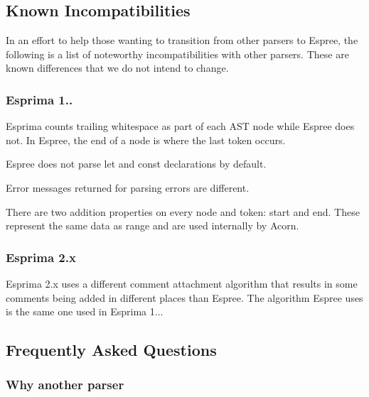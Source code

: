 \subsection*{Known Incompatibilities}

In an effort to help those wanting to transition from other parsers to Espree, the following is a list of noteworthy incompatibilities with other parsers. These are known differences that we do not intend to change.

\subsubsection*{Esprima 1..}


\begin{DoxyItemize}
\item Esprima counts trailing whitespace as part of each A\+ST node while Espree does not. In Espree, the end of a node is where the last token occurs.
\item Espree does not parse {\ttfamily let} and {\ttfamily const} declarations by default.
\item Error messages returned for parsing errors are different.
\item There are two addition properties on every node and token\+: {\ttfamily start} and {\ttfamily end}. These represent the same data as {\ttfamily range} and are used internally by Acorn.
\end{DoxyItemize}

\subsubsection*{Esprima 2.\+x}


\begin{DoxyItemize}
\item Esprima 2.\+x uses a different comment attachment algorithm that results in some comments being added in different places than Espree. The algorithm Espree uses is the same one used in Esprima 1...
\end{DoxyItemize}

\subsection*{Frequently Asked Questions}

\subsubsection*{Why another parser}

